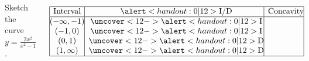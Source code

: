 \begin{frame}[t]
\begin{example}[Example 1, p. 245]
\begin{columns}[t]
Sketch the curve $y = \frac{2x^2}{x^2-1}$.
\ %

\abovedisplayskip=0pt
\belowdisplayskip=0pt
\[
\begin{array}{|@{}c@{}|c@{}|c@{}|}
\hline
\textrm{Interval}&\alert<handout:0| 12>{\textrm{I/D}}&\textrm{Concavity}\\
\hline
(-\infty , -1)&%
\uncover<12->{\alert<handout:0| 12>{\textrm{I}}}&\\%
(-1 , 0)&%
\uncover<12->{\alert<handout:0| 12>{\textrm{I}}}&\\%
(0 , 1)&%
\uncover<12->{\alert<handout:0| 12>{\textrm{D}}}&\\%
(1 , \infty)&%
\uncover<12->{\alert<handout:0| 12>{\textrm{D}}}&\\%
\hline
\end{array}
\]


\end{columns}
\end{example}
\end{frame}
